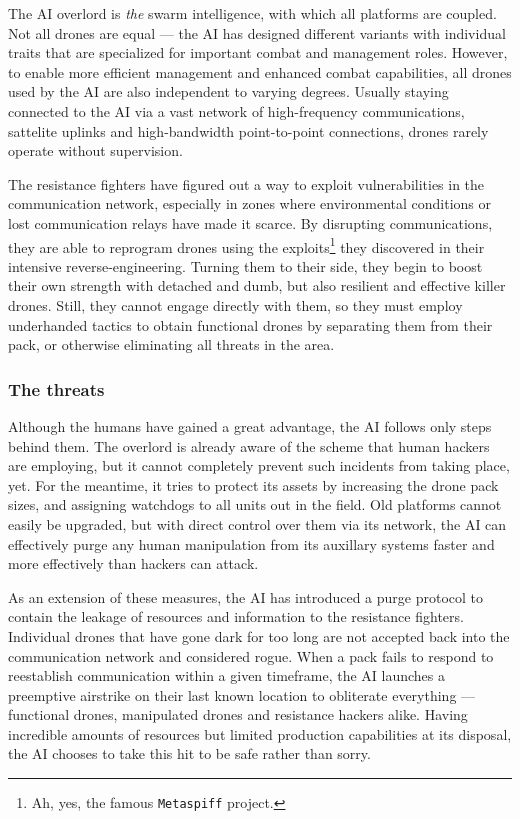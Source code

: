 The AI overlord is \emph{the} swarm intelligence, with which all platforms are coupled. Not all drones are equal --- the AI has designed different variants with individual traits that are specialized for important combat and management roles. However, to enable more efficient management and enhanced combat capabilities, all drones used by the AI are also independent to varying degrees.
Usually staying connected to the AI via a vast network of high-frequency communications, sattelite uplinks and high-bandwidth point-to-point connections, drones rarely operate without supervision.

The resistance fighters have figured out a way to exploit vulnerabilities in the communication network, especially in zones where environmental conditions or lost communication relays have made it scarce.
By disrupting communications, they are able to reprogram drones using the exploits\footnote{Ah, yes, the famous \texttt{Metaspiff} project.} they discovered in their intensive reverse-engineering.
Turning them to their side, they begin to boost their own strength with detached and dumb, but also resilient and effective killer drones.
Still, they cannot engage directly with them, so they must employ underhanded tactics to obtain functional drones by separating them from their pack, or otherwise eliminating all threats in the area.

\subsubsection*{The threats}

Although the humans have gained a great advantage, the AI follows only steps behind them.
The overlord is already aware of the scheme that human hackers are employing, but it cannot completely prevent such incidents from taking place, yet.
For the meantime, it tries to protect its assets by increasing the drone pack sizes, and assigning watchdogs to all units out in the field.
Old platforms cannot easily be upgraded, but with direct control over them via its network, the AI can effectively purge any human manipulation from its auxillary systems faster and more effectively than hackers can attack.

As an extension of these measures, the AI has introduced a purge protocol to contain the leakage of resources and information to the resistance fighters.
Individual drones that have gone dark for too long are not accepted back into the communication network and considered rogue.
When a pack fails to respond to reestablish communication within a given timeframe, the AI launches a preemptive airstrike on their last known location to obliterate everything --- functional drones, manipulated drones and resistance hackers alike.
Having incredible amounts of resources but limited production capabilities at its disposal, the AI chooses to take this hit to be safe rather than sorry.

